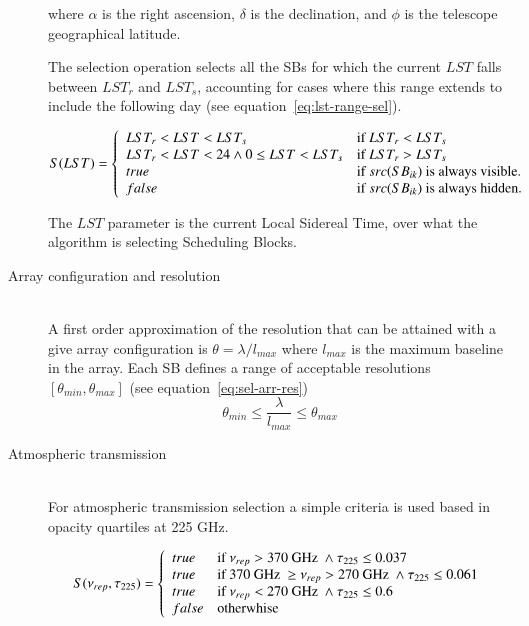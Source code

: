 \begin{description}
where $\alpha$ is the right ascension, $\delta$ is the declination, and
$\phi$ is the telescope geographical latitude.


The selection operation selects all the SBs for which the current $LST$ falls
between $LST_r$ and $LST_s$, accounting for cases where this range extends to include
the following day (see equation~\ref{eq:lst-range-sel}).

\begin{equation}
\label{eq:lst-range-sel}
S(LST) = \left\{ 
	\begin{array}{l l}
	LST_r < LST < LST_s & \mbox{if } LST_r < LST_s \\
	LST_r < LST < 24 \land 0 \leq LST < LST_s & \mbox{if } LST_r > LST_s  \\
	true & \mbox{if } src(SB_{ik}) \mbox{ is always visible.} \\
	false & \mbox{if } src(SB_{ik}) \mbox{ is always hidden.} \\
	\end{array} \right .
\end{equation}

The $LST$ parameter is the current Local Sidereal Time, over what the algorithm is selecting Scheduling Blocks.

\item[Array configuration and resolution] \hfill \\
A first order approximation of the resolution that can be attained with a give
array configuration is $\theta = \lambda / l_{max}$ where $l_{max}$ is the maximum
baseline in the array. Each SB defines a range of acceptable resolutions $[\theta_{min}, \theta_{max}]$ (see equation~\ref{eq:sel-arr-res})
\begin{equation}
\label{eq:sel-arr-res}
\theta_{min} \leq \frac{\lambda}{l_{max}} \leq \theta_{max}
\end{equation}

\item[Atmospheric transmission] \hfill \\
For atmospheric transmission selection a simple criteria is used based in opacity quartiles at 225 GHz.

\begin{equation}
S(\nu_{rep}, \tau_{225}) = \left\{
    \begin{array}{l l}
    true & \mbox{if } \nu_{rep} > 370 \mbox{ GHz } \land \tau_{225} \leq 0.037 \\
    true & \mbox{if } 370 \mbox{ GHz } \geq \nu_{rep} > 270 \mbox{ GHz } \land \tau_{225} \leq 0.061 \\
    true & \mbox{if } \nu_{rep} < 270 \mbox{ GHz } \land \tau_{225} \leq 0.6\\
    false & \mbox{otherwhise}
    \end{array} \right . 
\end{equation}


\end{description}

